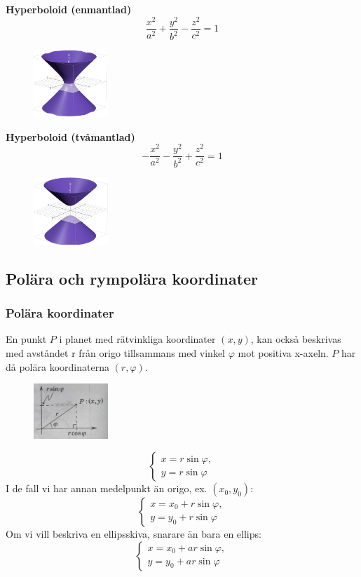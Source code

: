 \documentclass[a4paper,12pt]{article}
\begin{document}
\textbf{Hyperboloid (enmantlad)}
\[
\frac{x^2}{a^2} + \frac{y^2}{b^2} - \frac{z^2}{c^2} = 1
\]
\begin{figure}[H]
  \centering
  \includegraphics[width=0.25\textwidth]{enmantladhyperboloid.png}
\end{figure}

\textbf{Hyperboloid (tvåmantlad)}
\[
-\frac{x^2}{a^2} - \frac{y^2}{b^2} + \frac{z^2}{c^2} = 1
\]
\begin{figure}[H]
  \centering
  \includegraphics[width=0.25\textwidth]{tvamantladhyperboloid.png}
\end{figure}

\subsection{Polära och rympolära koordinater}
\subsubsection*{Polära koordinater}
En punkt $P$ i planet med rätvinkliga koordinater $(x, y)$, 
kan också beskrivas med avståndet r från origo tillsammans med vinkel $\varphi$ mot positiva x-axeln.
$P$ har då polära koordinaterna $(r, \varphi)$. 
\begin{figure}[H]
  \centering
  \includegraphics[width=0.25\textwidth]{polarakoordinater.png}
\end{figure}
\[
\begin{cases}
x = r \sin \varphi, \\
y = r \sin \varphi 
\end{cases}
\]
I de fall vi har annan medelpunkt än origo, ex. $(x_0, y_0)$:
\[
\begin{cases}
x = x_0 + r \sin \varphi, \\
y = y_0 + r \sin \varphi 
\end{cases}
\]
Om vi vill beskriva en ellipsskiva, snarare än bara en ellips:
\[
\begin{cases}
x = x_0 + a r \sin \varphi, \\
y = y_0 + a r \sin \varphi 
\end{cases}
\]
\end{document}
